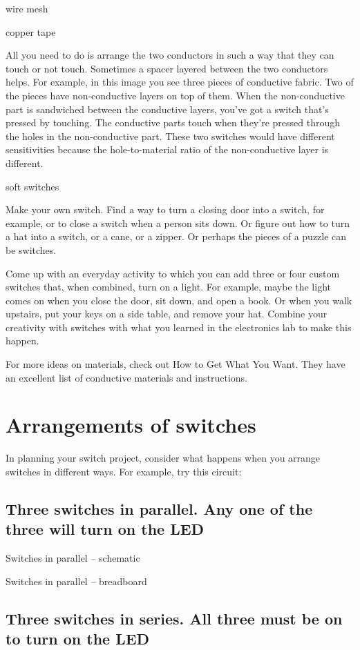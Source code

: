wire mesh

copper tape

All you need to do is arrange the two conductors in such a way that they can touch or not touch. Sometimes a spacer layered between the two conductors helps. For example, in this image you see three pieces of conductive fabric. Two of the pieces have non-conductive layers on top of them. When the non-conductive part is sandwiched between the conductive layers, you've got a switch that's pressed by touching. The conductive parts touch when they're pressed through the holes in the non-conductive part. These two switches would have different sensitivities because the hole-to-material ratio of the non-conductive layer is different.

soft switches

Make your own switch. Find a way to turn a closing door into a switch, for example, or to close a switch when a person sits down. Or figure out how to turn a hat into a switch, or a cane, or a zipper. Or perhaps the pieces of a puzzle can be switches.

Come up with an everyday activity to which you can add three or four custom switches that, when combined, turn on a light. For example, maybe the light comes on when you close the door, sit down, and open a book. Or when you walk upstairs, put your keys on a side table, and remove your hat. Combine your creativity with switches with what you learned in the electronics lab to make this happen.

For more ideas on materials, check out How to Get What You Want. They have an excellent list of conductive materials and instructions.

\section{Arrangements of switches}

In planning your switch project, consider what happens when you arrange switches in different ways. For example, try this circuit:

\subsection{Three switches in parallel. Any one of the three will turn on the LED}


Switches in parallel -- schematic

Switches in parallel -- breadboard

\subsection{Three switches in series. All three must be on to turn on the LED}



